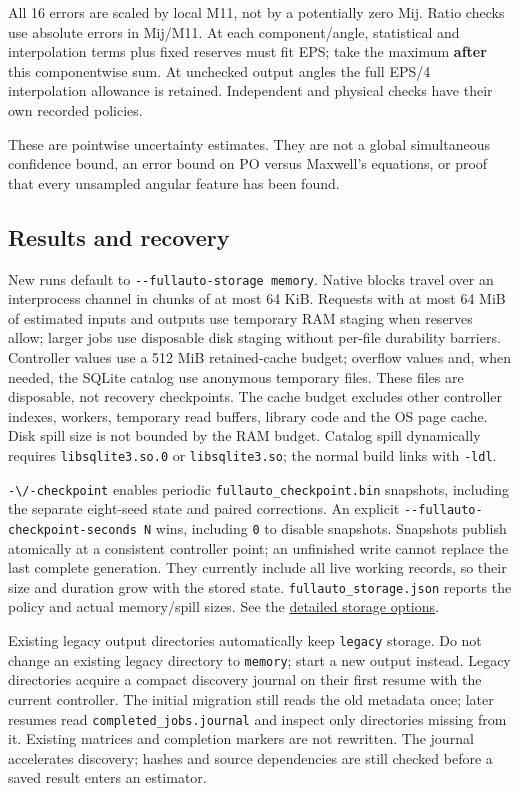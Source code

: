 All 16 errors are scaled by local M11, not by a potentially zero Mij.
Ratio checks use absolute errors in Mij/M11. At each component/angle,
statistical and interpolation terms plus fixed reserves must fit EPS;
take the maximum \textbf{after} this componentwise sum. At unchecked
output angles the full EPS/4 interpolation allowance is retained.
Independent and physical checks have their own recorded policies.

These are pointwise uncertainty estimates. They are not a global
simultaneous confidence bound, an error bound on PO versus Maxwell's
equations, or proof that every unsampled angular feature has been found.

\subsection{Results and recovery}\label{results-and-recovery}

New runs default to \texttt{-\/-fullauto-storage\ memory}. Native blocks
travel over an interprocess channel in chunks of at most 64 KiB.
Requests with at most 64 MiB of estimated inputs and outputs use
temporary RAM staging when reserves allow; larger jobs use disposable
disk staging without per-file durability barriers. Controller values use
a 512 MiB retained-cache budget; overflow values and, when needed, the
SQLite catalog use anonymous temporary files. These files are
disposable, not recovery checkpoints. The cache budget excludes other
controller indexes, workers, temporary read buffers, library code and
the OS page cache. Disk spill size is not bounded by the RAM budget.
Catalog spill dynamically requires \texttt{libsqlite3.so.0} or
\texttt{libsqlite3.so}; the normal build links with \texttt{-ldl}.

\nolinkurl{-\/-checkpoint} enables periodic
\nolinkurl{fullauto_checkpoint.bin} snapshots, including the separate
eight-seed state and paired corrections. An explicit
\texttt{-\/-fullauto-checkpoint-seconds\ N} wins, including \texttt{0}
to disable snapshots. Snapshots publish atomically at a consistent
controller point; an unfinished write cannot replace the last complete
generation. They currently include all live working records, so their
size and duration grow with the stored state.
\nolinkurl{fullauto_storage.json} reports the policy and actual
memory/spill sizes. See the
\href{FULLAUTO_RU.md\#рабочее-состояние-и-периодический-чекпоинт}{detailed
storage options}.

Existing legacy output directories automatically keep \texttt{legacy}
storage. Do not change an existing legacy directory to \texttt{memory};
start a new output instead. Legacy directories acquire a compact
discovery journal on their first resume with the current controller. The
initial migration still reads the old metadata once; later resumes read
\nolinkurl{completed_jobs.journal} and inspect only directories missing
from it. Existing matrices and completion markers are not rewritten. The
journal accelerates discovery; hashes and source dependencies are still
checked before a saved result enters an estimator.

